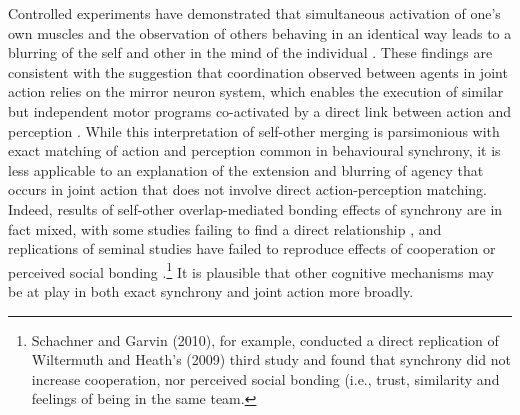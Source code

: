 \begin{CJK}{UTF8}{gbsn}
{Controlled experiments have demonstrated that simultaneous activation of one's own muscles and the observation of others behaving in an identical way leads to a blurring of the self and other in the mind of the individual \citep{Hurley2008,Rizzolatti2004}. These findings are consistent with the suggestion that coordination observed between agents in joint action relies on the  mirror neuron system, which enables the execution of similar but independent motor programs co-activated by a direct link between action and perception \citep{Rizzolatti2004}.  While this interpretation of self-other merging is parsimonious with exact matching of action and perception common in behavioural synchrony, it is less applicable to an explanation of the extension and blurring of agency that occurs in joint action that does not involve direct action-perception matching. Indeed, results of self-other overlap-mediated bonding effects of synchrony are in fact mixed, with some studies failing to find a direct relationship \citep{Cohen2013a,Reddish2013a}, and replications of seminal studies have failed to reproduce effects of cooperation or perceived social bonding \citep{Dam2012,Schachner2010}.\footnote{Schachner and Garvin (2010), for example, conducted a direct replication of Wiltermuth and Heath's (2009) third study and found that synchrony did not increase cooperation, nor perceived social bonding (i.e., trust, similarity and feelings of being in the same team.} It is plausible that other cognitive mechanisms may be at play in both exact synchrony and joint action more broadly.


}
\end{CJK}
